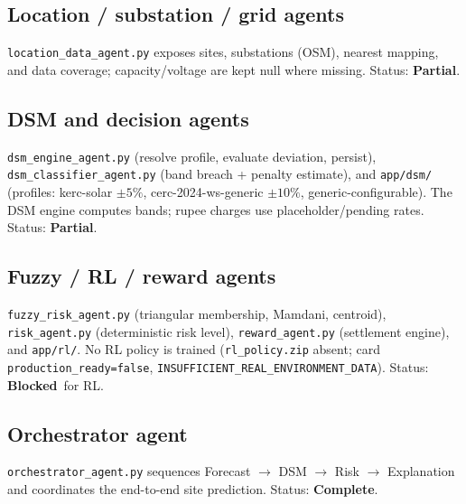 \documentclass[11pt,a4paper]{article}
\newcommand{\stC}{\textcolor{cok}{\textbf{Complete}}}
\newcommand{\stP}{\textcolor{cpart}{\textbf{Partial}}}
\newcommand{\stB}{\textcolor{cmiss}{\textbf{Blocked}}}
\newcommand{\code}[1]{\texttt{\small #1}}
\begin{document}
\subsection{Location / substation / grid agents}
\code{location\_data\_agent.py} exposes sites, substations (OSM), nearest mapping, and data
coverage; capacity/voltage are kept null where missing. Status: \stP.

\subsection{DSM and decision agents}
\code{dsm\_engine\_agent.py} (resolve profile, evaluate deviation, persist),
\code{dsm\_classifier\_agent.py} (band breach + penalty estimate), and \code{app/dsm/}
(profiles: kerc-solar $\pm5\%$, cerc-2024-ws-generic $\pm10\%$, generic-configurable). The
DSM engine computes bands; rupee charges use placeholder/pending rates. Status: \stP.

\subsection{Fuzzy / RL / reward agents}
\code{fuzzy\_risk\_agent.py} (triangular membership, Mamdani, centroid),
\code{risk\_agent.py} (deterministic risk level), \code{reward\_agent.py} (settlement
engine), and \code{app/rl/}. No RL policy is trained (\code{rl\_policy.zip} absent;
card \code{production\_ready=false}, \code{INSUFFICIENT\_REAL\_ENVIRONMENT\_DATA}). Status:
\stB\ for RL.

\subsection{Orchestrator agent}
\code{orchestrator\_agent.py} sequences Forecast $\to$ DSM $\to$ Risk $\to$ Explanation and
coordinates the end-to-end site prediction. Status: \stC.
\end{document}
